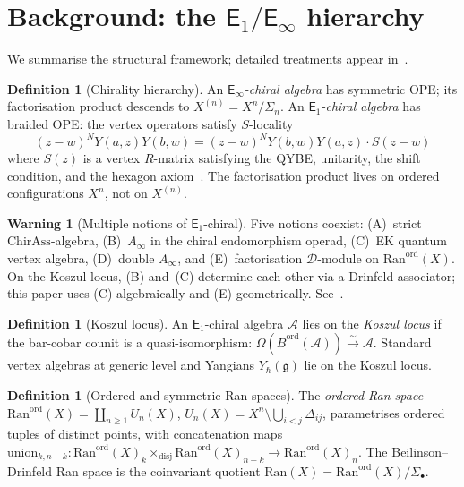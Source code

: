 \documentclass[11pt,reqno]{amsart}
\theoremstyle{definition}
\newtheorem{definition}[theorem]{Definition}
\newtheorem{warning}[theorem]{Warning}
\theoremstyle{remark}
\newcommand{\cA}{\mathcal{A}}
\newcommand{\cD}{\mathcal{D}}
\newcommand{\Ran}{\mathrm{Ran}}
\newcommand{\Ainf}{A_{\infty}}
\newcommand{\Eone}{\mathsf{E}_{1}}
\newcommand{\Einf}{\mathsf{E}_{\infty}}
\newcommand{\fg}{\mathfrak{g}}
\newcommand{\Barord}{\overline{B}^{\mathrm{ord}}}
\numberwithin{equation}{section}
\begin{document}
\section{Background: the $\Eone/\Einf$ hierarchy}
\label{sec:background}

We summarise the structural framework; detailed treatments
appear in~\cite[\S I--II]{Lorgat26I}.

\begin{definition}[Chirality hierarchy]
\label{def:chirality-hierarchy}
An $\Einf$\emph{-chiral algebra} has symmetric OPE; its
factorisation product descends to $X^{(n)} = X^n/\Sigma_n$.
An $\Eone$\emph{-chiral algebra} has braided OPE: the vertex
operators satisfy $S$-locality
\begin{equation}\label{eq:s-locality}
  (z - w)^N Y(a,z) Y(b,w)
  = (z - w)^N Y(b,w) Y(a,z) \cdot S(z - w)
\end{equation}
where $S(z)$ is a vertex $R$-matrix satisfying the QYBE,
unitarity, the shift condition, and the hexagon
axiom~\cite{EK00}. The factorisation product lives on
ordered configurations $X^n$, not on $X^{(n)}$.
\end{definition}

\begin{warning}[Multiple notions of $\Eone$-chiral]
\label{warn:multiple-e1-notions}
Five notions coexist:
\textup{(A)}~strict $\mathrm{ChirAss}$-algebra,
\textup{(B)}~$\Ainf$ in the chiral endomorphism operad,
\textup{(C)}~EK quantum vertex algebra,
\textup{(D)}~double $\Ainf$, and
\textup{(E)}~factorisation $\cD$-module on
$\Ran^{\mathrm{ord}}(X)$.
On the Koszul locus, \textup{(B)} and~\textup{(C)} determine
each other via a Drinfeld associator; this paper uses
\textup{(C)} algebraically and \textup{(E)} geometrically.
See~\cite[Warning~2.21]{Lorgat26I}.
\end{warning}

\begin{definition}[Koszul locus]
\label{def:koszul-locus}
An $\Eone$-chiral algebra $\cA$ lies on the
\emph{Koszul locus} if the bar-cobar counit is a quasi-isomorphism:
$\Omega(\Barord(\cA)) \xrightarrow{\;\sim\;} \cA$.
Standard vertex algebras at generic level and Yangians
$Y_\hbar(\fg)$ lie on the Koszul locus.
\end{definition}

\begin{definition}[Ordered and symmetric Ran spaces]
\label{def:ran-ord}
\label{def:ran-space}
The \emph{ordered Ran space}
$\Ran^{\mathrm{ord}}(X) = \coprod_{n \geq 1} U_n(X)$,
$U_n(X) = X^n \setminus \bigcup_{i<j}\Delta_{ij}$,
parametrises ordered tuples of distinct points, with
concatenation maps
$\mathrm{union}_{k,n-k} \colon
\Ran^{\mathrm{ord}}(X)_k \times_{\mathrm{disj}}
\Ran^{\mathrm{ord}}(X)_{n-k}
\to \Ran^{\mathrm{ord}}(X)_n$.
The Beilinson--Drinfeld Ran space is the coinvariant
quotient
$\Ran(X) = \Ran^{\mathrm{ord}}(X)/\Sigma_\bullet$.
\end{definition}
\end{document}
